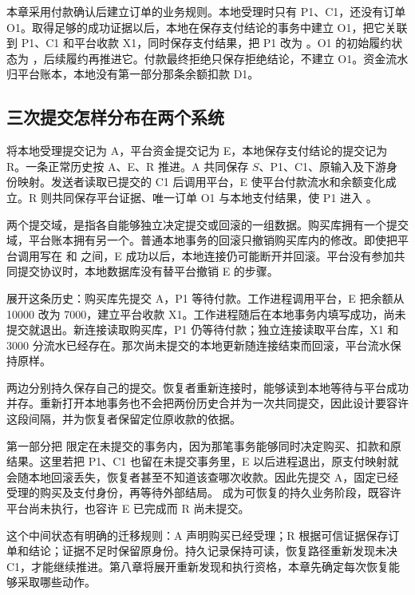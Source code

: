 本章采用付款确认后建立订单的业务规则。本地受理时只有 P1、C1，还没有订单 O1。取得足够的成功证据以后，本地在保存支付结论的事务中建立 O1，把它关联到 P1、C1 和平台收款 X1，同时保存支付结果，把 P1 改为 。O1 的初始履约状态为 ，后续履约再推进它。付款最终拒绝只保存拒绝结论，不建立 O1。资金流水归平台账本，本地没有第一部分那条余额扣款 D1。

\subsection*{三次提交怎样分布在两个系统}

将本地受理提交记为 A，平台资金提交记为 E，本地保存支付结论的提交记为 R。一条正常历史按 A、E、R 推进。A 共同保存 \(S\)、P1、C1、原输入及下游身份映射。发送者读取已提交的 C1 后调用平台，E 使平台付款流水和余额变化成立。R 则共同保存平台证据、唯一订单 O1 与本地支付结果，使 P1 进入 。


两个提交域，是指各自能够独立决定提交或回滚的一组数据。购买库拥有一个提交域，平台账本拥有另一个。普通本地事务的回滚只撤销购买库内的修改。即使把平台调用写在  和  之间，E 成功以后，本地连接仍可能断开并回滚。平台没有参加共同提交协议时，本地数据库没有替平台撤销 E 的步骤。

展开这条历史：购买库先提交 A，P1 等待付款。工作进程调用平台，E 把余额从 10000 改为 7000，建立平台收款 X1。工作进程随后在本地事务内填写成功，尚未提交就退出。新连接读取购买库，P1 仍等待付款；独立连接读取平台库，X1 和 3000 分流水已经存在。那次尚未提交的本地更新随连接结束而回滚，平台流水保持原样。

两边分别持久保存自己的提交。恢复者重新连接时，能够读到本地等待与平台成功并存。重新打开本地事务也不会把两份历史合并为一次共同提交，因此设计要容许这段间隔，并为恢复者保留定位原收款的依据。

第一部分把  限定在未提交的事务内，因为那笔事务能够同时决定购买、扣款和原结果。这里若把 P1、C1 也留在未提交事务里，E 以后进程退出，原支付映射就会随本地回滚丢失，恢复者甚至不知道该查哪次收款。因此先提交 A，固定已经受理的购买及支付身份，再等待外部结局。 成为可恢复的持久业务阶段，既容许平台尚未执行，也容许 E 已完成而 R 尚未提交。

这个中间状态有明确的迁移规则：A 声明购买已经受理；R 根据可信证据保存订单和结论；证据不足时保留原身份。持久记录保持可读，恢复路径重新发现未决 C1，才能继续推进。第八章将展开重新发现和执行资格，本章先确定每次恢复能够采取哪些动作。

